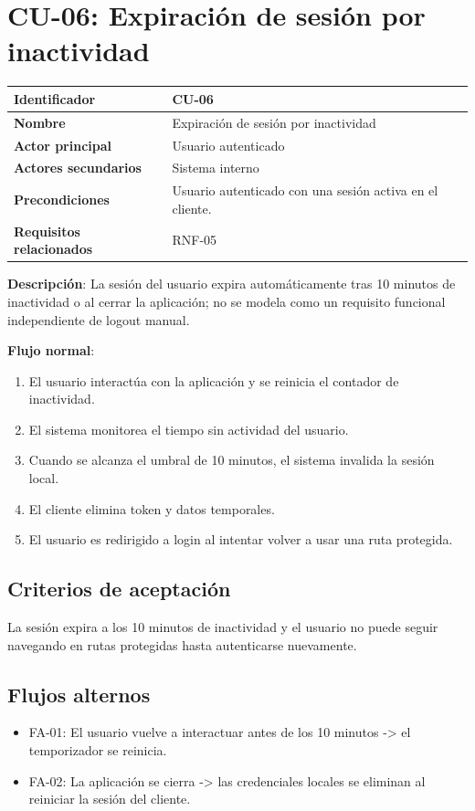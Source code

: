 \documentclass[12pt,a4paper]{article}
\begin{document}
\newpage
\section{CU-06: Expiraci\'on de sesi\'on por inactividad}
\begin{tabular}{|p{3.5cm}|p{10cm}|}
\hline
\textbf{Identificador} & CU-06 \\
\hline
\textbf{Nombre} & Expiraci\'on de sesi\'on por inactividad \\
\hline
\textbf{Actor principal} & Usuario autenticado \\
\hline
\textbf{Actores secundarios} & Sistema interno \\
\hline
\textbf{Precondiciones} & Usuario autenticado con una sesi\'on activa en el cliente. \\
\hline
\textbf{Requisitos relacionados} & RNF-05 \\
\hline
\end{tabular}

\vspace{0.5em}
\textbf{Descripci\'on}: La sesi\'on del usuario expira autom\'aticamente tras 10 minutos de inactividad o al cerrar la aplicaci\'on; no se modela como un requisito funcional independiente de logout manual.

\vspace{0.5em}
\textbf{Flujo normal}:
\begin{enumerate}[leftmargin=*]
    \item El usuario interact\'ua con la aplicaci\'on y se reinicia el contador de inactividad.
    \item El sistema monitorea el tiempo sin actividad del usuario.
    \item Cuando se alcanza el umbral de 10 minutos, el sistema invalida la sesi\'on local.
    \item El cliente elimina token y datos temporales.
    \item El usuario es redirigido a login al intentar volver a usar una ruta protegida.
\end{enumerate}

\subsection*{Criterios de aceptaci\'on}
La sesi\'on expira a los 10 minutos de inactividad y el usuario no puede seguir navegando en rutas protegidas hasta autenticarse nuevamente.

\subsection*{Flujos alternos}
\begin{itemize}[leftmargin=*]
    \item FA-01: El usuario vuelve a interactuar antes de los 10 minutos -> el temporizador se reinicia.
    \item FA-02: La aplicaci\'on se cierra -> las credenciales locales se eliminan al reiniciar la sesi\'on del cliente.
\end{itemize}
\end{document}
